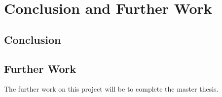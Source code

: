 \chapter{Conclusion and Further Work}
\label{chap:conclusion}
\section{Conclusion}

\section{Further Work}
The further work on this project will be to complete the master thesis. 